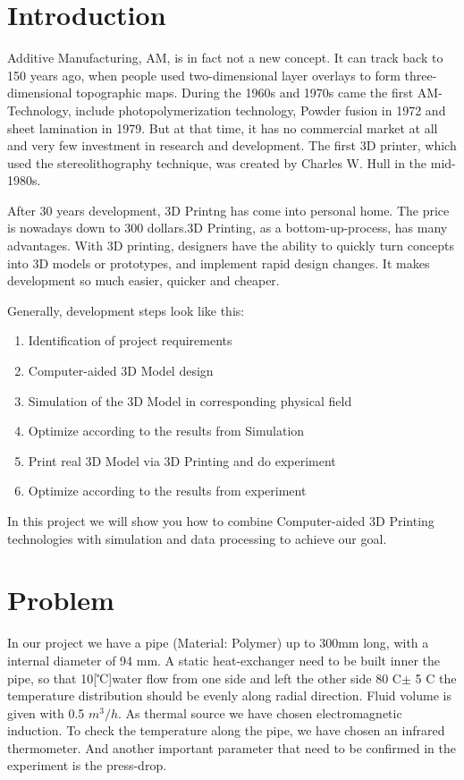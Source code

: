 \documentclass[journal,article,processes,submit,moreauthors,pdftex]{Definitions/mdpi}
\begin{document}

\section{Introduction}

Additive Manufacturing, AM, is in fact not a new concept. It can track back to 150 years ago, when people used two-dimensional layer overlays to form three-dimensional topographic maps. During the 1960s and 1970s came the first AM-Technology, include photopolymerization technology, Powder fusion in 1972 and sheet lamination in 1979. But at that time, it has no commercial market at all and very few investment in research and development. \cite{link-1}
The first 3D printer, which used the stereolithography technique, was created by Charles W. Hull in the mid-1980s. \cite{link-2}

After 30 years development, 3D Printng has come into personal home. The price is nowadays down to 300 dollars.3D Printing, as a bottom-up-process, has many advantages. With 3D printing, designers have the ability to quickly turn concepts into 3D models or prototypes, and implement rapid design changes. It makes development so much easier, quicker and cheaper. 

Generally, development steps look like this: 
\begin{enumerate}
    \item Identification of project requirements
    \item Computer-aided 3D Model design
    \item Simulation of the 3D Model in corresponding physical field
    \item Optimize according to the results from Simulation
    \item Print real 3D Model via 3D Printing and do experiment
    \item Optimize according to the results from experiment
\end{enumerate}


In this project we will show you how to combine Computer-aided 3D Printing technologies with simulation and data processing to achieve our goal.
 
\section{Problem}
In our project we have a pipe (Material: Polymer) up to 300mm long, with a internal diameter of 94 mm. A static heat-exchanger need to be built inner the pipe, so that 10[℃]water flow from one side and left the other side 80 \textdegree{}C$\pm$ 5 \textdegree{}C the temperature distribution should be evenly along radial direction. Fluid volume is given with 0.5 $m^3/h$. As thermal source we have chosen electromagnetic induction. To check the temperature along the pipe, we have chosen an infrared thermometer. And another important parameter that need to be confirmed in the experiment is the press-drop. 
\end{document}
